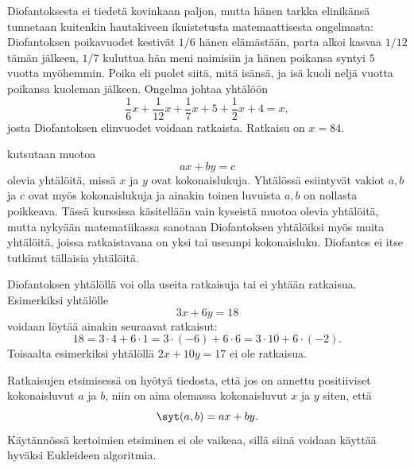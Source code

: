 Diofantoksesta ei tiedetä kovinkaan paljon, mutta hänen tarkka \hbox{elin}\-ikän\-sä tunnetaan kuitenkin hautakiveen ikuistetusta matemaattisesta ongelmasta: Diofantoksen poikavuodet kestivät $1/6$ hänen elämästään, parta alkoi kasvaa $1/12$ tämän jälkeen, $1/7$ kuluttua hän meni naimisiin ja hänen poikansa syntyi $5$ vuotta myöhemmin. Poika eli puolet siitä, mitä isänsä, ja isä kuoli neljä vuotta poikansa kuoleman jälkeen. Ongelma johtaa yhtälöön
\[
\frac{1}{6}x + \frac{1}{12} x + \frac{1}{7}x + 5 + \frac{1}{2}x+ 4=x,
\]
josta Diofantoksen elinvuodet voidaan ratkaista. Ratkaisu on $x=84$.

 kutsutaan muotoa
\[
ax + by = c
\]
olevia yhtälöitä, missä $x$ ja $y$ ovat kokonaislukuja. Yhtälössä esiintyvät vakiot $a,b$ ja $c$ ovat myös kokonaislukuja ja ainakin toinen luvuista $a,b$ on nollasta poikkeava. 
Tässä kurssissa käsitellään vain kyseistä muotoa olevia yhtälöitä, mutta nykyään matematiikassa sanotaan Diofantoksen yhtälöiksi myös muita yhtälöitä, joissa ratkaistavana on yksi tai useampi kokonaisluku. Diofantos ei itse tutkinut tällaisia yhtälöitä.

Diofantoksen yhtälöllä voi olla useita ratkaisuja tai ei yhtään ratkaisua. Esimerkiksi
yhtälölle
\[
3x + 6 y = 18
\]
voidaan löytää ainakin seuraavat ratkaisut:
\[
18 = 3\cdot 4 + 6\cdot 1 = 3\cdot (-6)+6\cdot 6 = 3\cdot10 + 6\cdot (-2).
\]
Toisaalta esimerkiksi yhtälöllä $2x+10 y =17$ ei ole ratkaisua.

Ratkaisujen etsimisessä on hyötyä tiedosta, että jos on annettu positiiviset kokonaisluvut $a$ ja $b$, niin on aina olemassa kokonaisluvut $x$ ja $y$ siten, että
\[
\syt(a,b) = ax + by.
\]
Käytännössä kertoimien etsiminen ei ole vaikeaa, sillä siinä voidaan käyttää hyväksi Eukleideen algoritmia.

